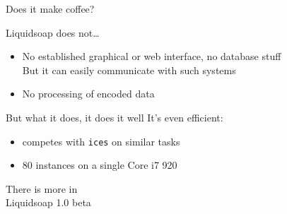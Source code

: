\documentclass{beamer}
\renewcommand{\emph}[1]{\alert{#1}}
\begin{document}

\begin{frame}{Does it make coffee?}

\pause

\begin{block}{Liquidsoap does not\ldots}
\begin{itemize}
\item No established graphical or web interface, no database stuff
  \\ \emph{But} it can easily communicate with such systems
\item No processing of encoded data
\end{itemize}
\end{block}

\pause

\begin{block}{But what it does, it does it well}
It's even \emph{efficient}:
\begin{itemize}
\item competes with \texttt{ices} on similar tasks
\item 80 instances on a single Core i7 920
\end{itemize}
\end{block}

\end{frame}


\begin{frame}

\vfill\begin{center}
There is more in \\
\LARGE Liquidsoap \emph{1.0} beta
\end{center}\vfill

\end{frame}
\end{document}
